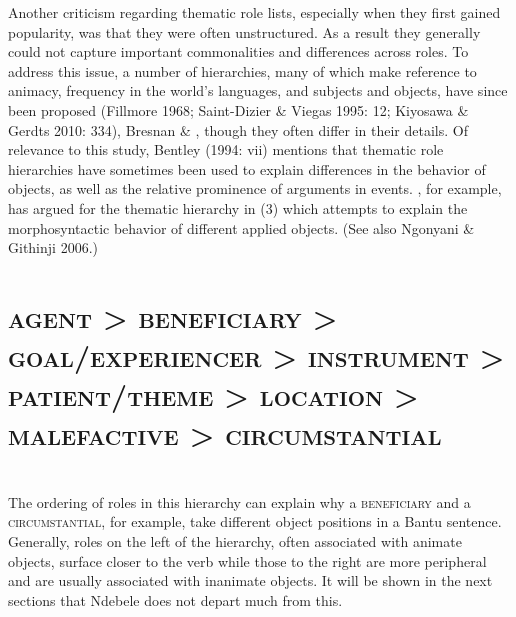 \documentclass[output=paper]{langsci/langscibook}
\begin{document}
Another criticism regarding thematic role lists, especially when they first gained popularity, was that they were often unstructured. As a result they generally could not capture important commonalities and differences across roles. To address this issue, a number of hierarchies, many of which make reference to animacy, frequency in the world’s languages, and subjects and objects, have since been proposed (Fillmore 1968; Saint-Dizier \& Viegas 1995: 12; Kiyosawa \& Gerdts 2010: 334), Bresnan \& \citet{Kanerva1989}, though they often differ in their details. Of relevance to this study, Bentley (1994: vii) mentions that thematic role hierarchies have sometimes been used to explain differences in the behavior of objects, as well as the relative prominence of arguments in events. \citet[129]{Mchombo2004}, for example, has argued for the thematic hierarchy in (3) which attempts to explain the morphosyntactic behavior of different applied objects. (See also Ngonyani \& Githinji 2006.)

\chapter[agent {\textgreater} beneficiary {\textgreater} goal/experiencer {\textgreater} instrument {\textgreater} patient/theme {\textgreater}   location {\textgreater} malefactive {\textgreater} circumstantial]{\textsc{agent {\textgreater} beneficiary {\textgreater} goal/experiencer {\textgreater} instrument {\textgreater} patient/theme {\textgreater}   location {\textgreater} malefactive {\textgreater} circumstantial}}
\chapter[ ]{ }

The ordering of roles in this hierarchy can explain why a \textsc{beneficiary} and a \textsc{circumstantial}, for example, take different object positions in a Bantu sentence. Generally, roles on the left of the hierarchy, often associated with animate objects, surface closer to the verb while those to the right are more peripheral and are usually associated with inanimate objects. It will be shown in the next sections that Ndebele does not depart much from this.
\end{document}
